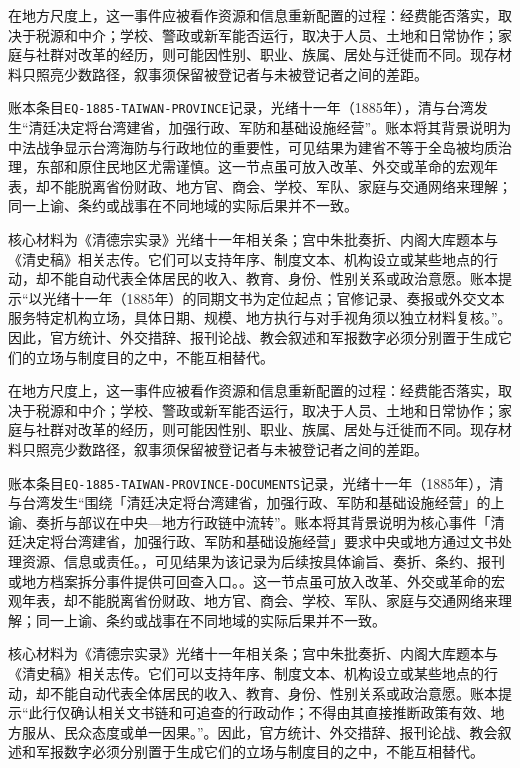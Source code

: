 在地方尺度上，这一事件应被看作资源和信息重新配置的过程：经费能否落实，取决于税源和中介；学校、警政或新军能否运行，取决于人员、土地和日常协作；家庭与社群对改革的经历，则可能因性别、职业、族属、居处与迁徙而不同。现存材料只照亮少数路径，叙事须保留被登记者与未被登记者之间的差距。

账本条目\texttt{EQ-1885-TAIWAN-PROVINCE}记录，光绪十一年（1885年），清与台湾发生“清廷决定将台湾建省，加强行政、军防和基础设施经营”。账本将其背景说明为中法战争显示台湾海防与行政地位的重要性，可见结果为建省不等于全岛被均质治理，东部和原住民地区尤需谨慎。这一节点虽可放入改革、外交或革命的宏观年表，却不能脱离省份财政、地方官、商会、学校、军队、家庭与交通网络来理解；同一上谕、条约或战事在不同地域的实际后果并不一致。

核心材料为《清德宗实录》光绪十一年相关条；宫中朱批奏折、内阁大库题本与《清史稿》相关志传。它们可以支持年序、制度文本、机构设立或某些地点的行动，却不能自动代表全体居民的收入、教育、身份、性别关系或政治意愿。账本提示“以光绪十一年（1885年）的同期文书为定位起点；官修记录、奏报或外交文本服务特定机构立场，具体日期、规模、地方执行与对手视角须以独立材料复核。”。因此，官方统计、外交措辞、报刊论战、教会叙述和军报数字必须分别置于生成它们的立场与制度目的之中，不能互相替代。

在地方尺度上，这一事件应被看作资源和信息重新配置的过程：经费能否落实，取决于税源和中介；学校、警政或新军能否运行，取决于人员、土地和日常协作；家庭与社群对改革的经历，则可能因性别、职业、族属、居处与迁徙而不同。现存材料只照亮少数路径，叙事须保留被登记者与未被登记者之间的差距。

账本条目\texttt{EQ-1885-TAIWAN-PROVINCE-DOCUMENTS}记录，光绪十一年（1885年），清与台湾发生“围绕「清廷决定将台湾建省，加强行政、军防和基础设施经营」的上谕、奏折与部议在中央—地方行政链中流转”。账本将其背景说明为核心事件「清廷决定将台湾建省，加强行政、军防和基础设施经营」要求中央或地方通过文书处理资源、信息或责任。，可见结果为该记录为后续按具体谕旨、奏折、条约、报刊或地方档案拆分事件提供可回查入口。。这一节点虽可放入改革、外交或革命的宏观年表，却不能脱离省份财政、地方官、商会、学校、军队、家庭与交通网络来理解；同一上谕、条约或战事在不同地域的实际后果并不一致。

核心材料为《清德宗实录》光绪十一年相关条；宫中朱批奏折、内阁大库题本与《清史稿》相关志传。它们可以支持年序、制度文本、机构设立或某些地点的行动，却不能自动代表全体居民的收入、教育、身份、性别关系或政治意愿。账本提示“此行仅确认相关文书链和可追查的行政动作；不得由其直接推断政策有效、地方服从、民众态度或单一因果。”。因此，官方统计、外交措辞、报刊论战、教会叙述和军报数字必须分别置于生成它们的立场与制度目的之中，不能互相替代。


